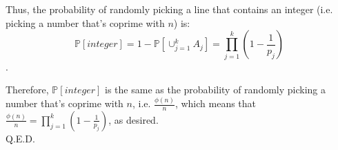 \documentclass{article}
\begin{document}
Thus, the probability of randomly picking a line that contains an integer (i.e. picking a number that's coprime with $n$) is:
$$\mathbb{P}[integer] = 1 - \mathbb{P}[\cup_{j=1}^k A_j] = \prod\limits_{j=1}^k (1-\frac{1}{p_j})$$.

Therefore, $\mathbb{P}[integer]$ is the same as the probability of randomly picking a number that's coprime with $n$, i.e. $\frac{\phi(n)}{n}$, which means that
$\frac{\phi(n)}{n} = \prod\limits_{j=1}^k (1-\frac{1}{p_j})$, as desired. \\

Q.E.D.
\end{document}
